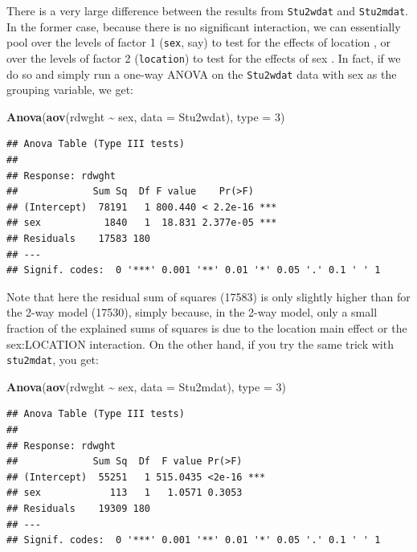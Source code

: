 \documentclass[
  12pt,
]{book}
\newenvironment{Shaded}{\begin{snugshade}}{\end{snugshade}}
\newcommand{\DataTypeTok}[1]{\textcolor[rgb]{0.13,0.29,0.53}{#1}}
\newcommand{\DecValTok}[1]{\textcolor[rgb]{0.00,0.00,0.81}{#1}}
\newcommand{\KeywordTok}[1]{\textcolor[rgb]{0.13,0.29,0.53}{\textbf{#1}}}
\newcommand{\NormalTok}[1]{#1}
\newcommand{\OperatorTok}[1]{\textcolor[rgb]{0.81,0.36,0.00}{\textbf{#1}}}
\newcommand{\StringTok}[1]{\textcolor[rgb]{0.31,0.60,0.02}{#1}}
\begin{document}
There is a very large difference between the results from \texttt{Stu2wdat} and \texttt{Stu2mdat}. In the former case, because there is no significant interaction, we can essentially pool over the levels of factor 1 (\texttt{sex}, say) to test for the effects of location , or over the levels of factor 2 (\texttt{location}) to test for the effects of sex . In fact, if we do so and simply run a one-way ANOVA on the \texttt{Stu2wdat} data with sex as the grouping variable, we get:

\begin{Shaded}
\begin{Highlighting}[]
\KeywordTok{Anova}\NormalTok{(}\KeywordTok{aov}\NormalTok{(rdwght }\OperatorTok{\textasciitilde{}}\StringTok{ }\NormalTok{sex, }\DataTypeTok{data =}\NormalTok{ Stu2wdat), }\DataTypeTok{type =} \DecValTok{3}\NormalTok{)}
\end{Highlighting}
\end{Shaded}

\begin{verbatim}
## Anova Table (Type III tests)
## 
## Response: rdwght
##             Sum Sq  Df F value    Pr(>F)    
## (Intercept)  78191   1 800.440 < 2.2e-16 ***
## sex           1840   1  18.831 2.377e-05 ***
## Residuals    17583 180                      
## ---
## Signif. codes:  0 '***' 0.001 '**' 0.01 '*' 0.05 '.' 0.1 ' ' 1
\end{verbatim}

Note that here the residual sum of squares (17583) is only slightly higher than for the 2-way model (17530), simply because, in the 2-way model, only a small fraction of the explained sums of squares is due to the location main effect or the sex:LOCATION interaction. On the other hand, if you try the same trick with \texttt{stu2mdat}, you get:

\begin{Shaded}
\begin{Highlighting}[]
\KeywordTok{Anova}\NormalTok{(}\KeywordTok{aov}\NormalTok{(rdwght }\OperatorTok{\textasciitilde{}}\StringTok{ }\NormalTok{sex, }\DataTypeTok{data =}\NormalTok{ Stu2mdat), }\DataTypeTok{type =} \DecValTok{3}\NormalTok{)}
\end{Highlighting}
\end{Shaded}

\begin{verbatim}
## Anova Table (Type III tests)
## 
## Response: rdwght
##             Sum Sq  Df  F value Pr(>F)    
## (Intercept)  55251   1 515.0435 <2e-16 ***
## sex            113   1   1.0571 0.3053    
## Residuals    19309 180                    
## ---
## Signif. codes:  0 '***' 0.001 '**' 0.01 '*' 0.05 '.' 0.1 ' ' 1
\end{verbatim}
\end{document}
